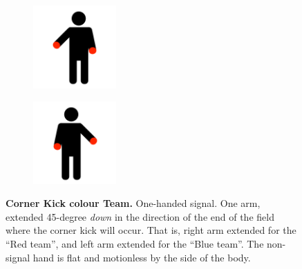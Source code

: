         \begin{figure}[ht!]
            \centering
            \begin{subfigure}{.33\textwidth}
                \includegraphics[height=120px]{figs/referee-signals/corner-kick.png}
            \end{subfigure}
            \begin{subfigure}{.33\textwidth}
                \includegraphics[height=120px]{figs/referee-signals/corner-kick-flipped.png}
            \end{subfigure}
            \caption{\textbf{Corner Kick \textlangle{}colour\textrangle{} Team.}
            One-handed signal. One arm, extended 45-degree \emph{down} in the direction of the end of the field where the corner kick will occur. That is, right arm extended for the ``Red team'', and left arm extended for the ``Blue team''. The non-signal hand is flat and motionless by the side of the body.}
        \end{figure}
            
